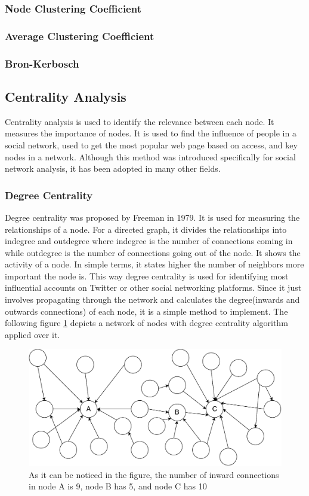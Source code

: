 \documentclass[journal,twoside,web]{ieeecolor}
\begin{document}
\subsubsection{Node Clustering Coefficient}
\subsubsection{Average Clustering Coefficient}
\subsubsection{Bron-Kerbosch}

\subsection{Centrality Analysis}
Centrality analysis is used to identify the relevance between each node. It measures the importance of nodes. It is used to find the influence of people in a social network, used to get the most popular web page based on access, and key nodes in a network. Although this method was introduced specifically for social network analysis, it has been adopted in many other fields.

\subsubsection{Degree Centrality}
Degree centrality was proposed by Freeman in 1979\cite{25}. It is used for measuring the relationships of a node. For a directed graph, it divides the relationships into indegree and outdegree where indegree is the number of connections coming in while outdegree is the number of connections going out of the node. It shows the activity of a node. In simple terms, it states higher the number of neighbors more important the node is. This way degree centrality is used for identifying most influential accounts on Twitter or other social networking platforms. Since it just involves propagating through the network and calculates the degree(inwards and outwards connections) of each node, it is a simple method to implement. The following figure \ref{fig7} depicts a network of nodes with degree centrality algorithm applied over it.

\begin{figure}[!h]
    \centerline{\includegraphics[scale=0.45]{figures/degree_centrality.pdf}}
    \caption{As it can be noticed in the figure, the number of inward connections in node A is 9, node B has 5, and node C has 10}
    \label{fig7}
\end{figure}
\end{document}

